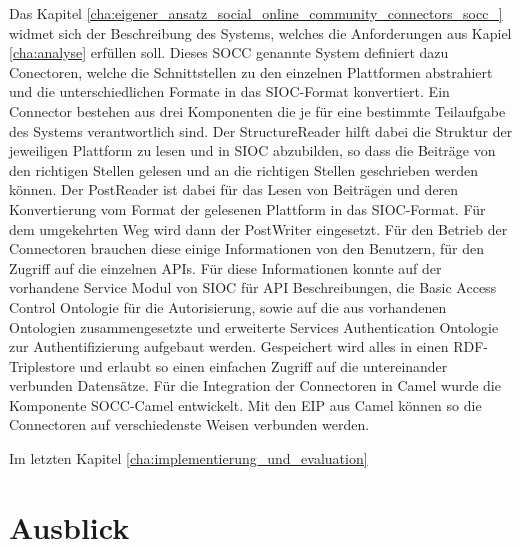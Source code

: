 Das Kapitel \ref{cha:eigener_ansatz_social_online_community_connectors_socc_} widmet sich der Beschreibung des Systems, welches die Anforderungen aus Kapiel \ref{cha:analyse} erfüllen soll. Dieses SOCC genannte System definiert dazu Conectoren, welche die Schnittstellen zu den einzelnen Plattformen abstrahiert und die unterschiedlichen Formate in das SIOC-Format konvertiert. Ein Connector bestehen aus drei Komponenten die je für eine bestimmte Teilaufgabe des Systems verantwortlich sind. Der StructureReader hilft dabei die Struktur der jeweiligen Plattform zu lesen und  in SIOC abzubilden, so dass die Beiträge von den richtigen Stellen gelesen und an die richtigen Stellen geschrieben werden können. Der PostReader ist dabei für das Lesen von Beiträgen und deren Konvertierung vom Format der gelesenen Plattform in das SIOC-Format. Für dem umgekehrten Weg wird dann der PostWriter eingesetzt. Für den Betrieb der Connectoren brauchen diese einige Informationen von den Benutzern, für den Zugriff auf die einzelnen APIs. Für diese Informationen konnte auf der vorhandene Service Modul von SIOC für API Beschreibungen, die Basic Access Control Ontologie für die Autorisierung, sowie auf die aus vorhandenen Ontologien zusammengesetzte und erweiterte Services Authentication Ontologie zur Authentifizierung aufgebaut werden. Gespeichert wird alles in einen RDF-Triplestore und erlaubt so einen einfachen Zugriff auf die untereinander verbunden Datensätze. Für die Integration der Connectoren in Camel wurde die Komponente SOCC-Camel entwickelt. Mit den EIP aus Camel können so die Connectoren auf verschiedenste Weisen verbunden werden.

Im letzten Kapitel \ref{cha:implementierung_und_evaluation}


\section{Ausblick} %
\label{sec:ausblick}


